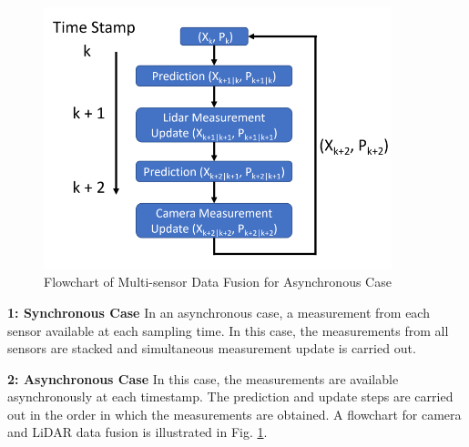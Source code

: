 \begin{figure}
    \centering
    \includegraphics[width=0.9\textwidth]{Images/fusion.png}
    \caption{Flowchart of Multi-sensor Data Fusion for Asynchronous Case}
    \label{fusion}
\end{figure}

\textbf{1: Synchronous Case}
In an asynchronous case, a measurement from each sensor available at each sampling time. In this case, the measurements from all sensors are stacked and simultaneous measurement update is carried out. 

\textbf{2: Asynchronous Case}
In this case, the measurements are available asynchronously at each timestamp. The prediction and update steps are carried out in the order in which the measurements are obtained. A flowchart for camera and LiDAR data fusion is illustrated in Fig. \ref{fusion}.



